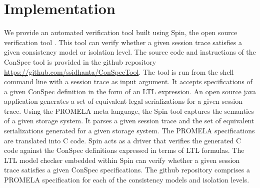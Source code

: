 \documentclass{sig-alternate-05-2015}
\begin{document}
 \section{Implementation}
 We provide an automated verification tool built using Spin, the open source verification tool  \cite{Holzmann:2003:SMC:1405716}. This tool can verify whether a given session trace satisfies a given consistency model or isolation level. The source code and instructions of the ConSpec tool is provided in the github repository \url{https://github.com/ssidhanta/ConSpecTool}. The tool is run from the  shell command line with a session trace as input argument. It accepts specifications of a given ConSpec definition in the form of an LTL expression. An open source java application generates a set of equivalent legal serializations for a given session trace. Using the  PROMELA meta language, the Spin tool captures the semantics of a given storage system. It parses a given session trace and the set of equivalent serializations generated for a given storage system. The PROMELA specifications are translated into C code. Spin acts as a driver that verifies the generated C code  against the  ConSpec definitions expressed in terms of LTL formulas.  The LTL model checker embedded within Spin can verify whether a given session trace satisfies a given ConSpec specifications. The github repository comprises a PROMELA specification for each of the consistency models and isolation levels.
  
\end{document}
